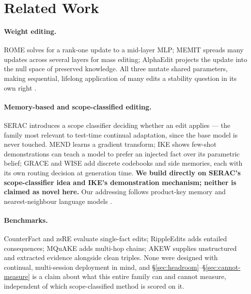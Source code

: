 \documentclass{article}
\begin{document}
\section{Related Work}
\label{sec:related}

\paragraph{Weight editing.}
ROME \citep{meng2022rome} solves for a rank-one update to a mid-layer MLP;
MEMIT \citep{meng2023memit} spreads many updates across several layers for
mass editing; AlphaEdit \citep{fang2025alphaedit} projects the update into
the null space of preserved knowledge. All three mutate shared parameters,
making sequential, lifelong application of many edits a stability question
in its own right \citep{hase2023localization}.

\paragraph{Memory-based and scope-classified editing.}
SERAC \citep{mitchell2022serac} introduces a scope classifier deciding
whether an edit applies --- the family most relevant to test-time continual
adaptation, since the base model is never touched. MEND
\citep{mitchell2022mend} learns a gradient transform; IKE
\citep{zheng2023ike} shows few-shot demonstrations can teach a model to
prefer an injected fact over its parametric belief; GRACE
\citep{hartvigsen2023grace} and WISE \citep{wang2024wise} add discrete
codebooks and side memories, each with its own routing decision at
generation time. \textbf{We build directly on SERAC's scope-classifier
idea and IKE's demonstration mechanism; neither is claimed as novel here.}
Our addressing follows product-key memory \citep{lample2019pkm} and
nearest-neighbour language models \citep{khandelwal2020knnlm}.

\paragraph{Benchmarks.}
CounterFact and zsRE evaluate single-fact edits; RippleEdits
\citep{cohen2024ripple} adds entailed consequences; MQuAKE
\citep{zhong2023mquake} adds multi-hop chains; AKEW \citep{wu2024akew}
supplies unstructured and extracted evidence alongside clean triples. None
were designed with continual, multi-session deployment in mind, and
\S\ref{sec:headroom}--\S\ref{sec:cannot-measure} is a claim about what this
entire family can and cannot measure, independent of which
scope-classified method is scored on it.
\end{document}

